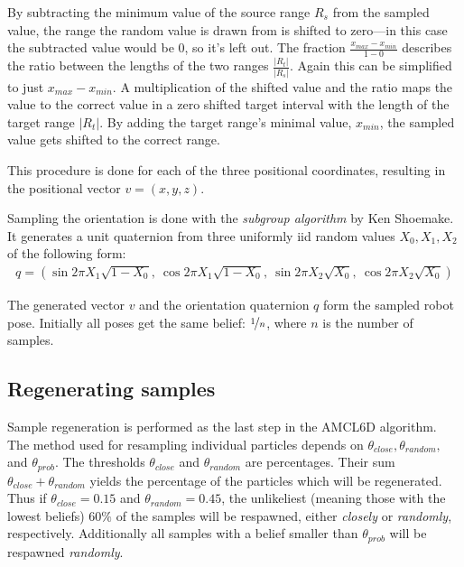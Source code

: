 \documentclass[Thesis.tex]{subfiles}
\begin{document}
By subtracting the minimum value of the source range $R_s$ from the sampled value, the range the random value is drawn from is shifted to zero---in this case the subtracted value would be $0$, so it's left out. The fraction $\frac{ x_{max} - x_{min} }{ 1 - 0 }$ describes the ratio between the lengths of the two ranges $\frac{|R_t|}{|R_s|}$. Again this can be simplified to just $x_{max}-x_{min}$. A multiplication of the shifted value and the ratio maps the value to the correct value in a zero shifted target interval with the length of the target range $|R_t|$. By adding the target range's minimal value, $x_{min}$, the sampled value gets shifted to the correct range.

This procedure is done for each of the three positional coordinates, resulting in the positional vector $v = \left(x, y, z\right)$.

Sampling the orientation is done with the \emph{subgroup algorithm} by Ken Shoemake\cite[p.~129-130]{gfxgems:1995}. It generates a unit quaternion from three uniformly \gls{iid} random values $X_0, X_1, X_2$ of the following form:
%
\begin{align}
q = \left( \sin{2\pi X_1}\sqrt{1-X_0},\: \cos{2\pi X_1}\sqrt{1-X_0},\: 
           \sin{2\pi X_2}\sqrt{  X_0},\: \cos{2\pi X_2}\sqrt{  X_0} \right)
\end{align}


The generated vector $v$ and the orientation quaternion $q$ form the sampled robot pose. Initially all poses get the same belief: $\nicefrac{1}{n}$, where $n$ is the number of samples.

\subsection{Regenerating samples}
Sample regeneration is performed as the last step in the \gls{AMCL6D} algorithm. The method used for resampling individual particles depends on $\theta_{close}, \theta_{random},$ and $\theta_{prob}$. The thresholds $\theta_{close}$ and $\theta_{random}$ are percentages. Their sum $\theta_{close}+\theta_{random}$ yields the percentage of the particles which will be regenerated. Thus if $\theta_{close} = 0.15$ and $\theta_{random} = 0.45$, the unlikeliest (meaning those with the lowest beliefs) $60 \%$ of the samples will be respawned, either \emph{closely} or \emph{randomly}, respectively. Additionally all samples with a belief smaller than $\theta_{prob}$ will be respawned \emph{randomly}.
\end{document}
